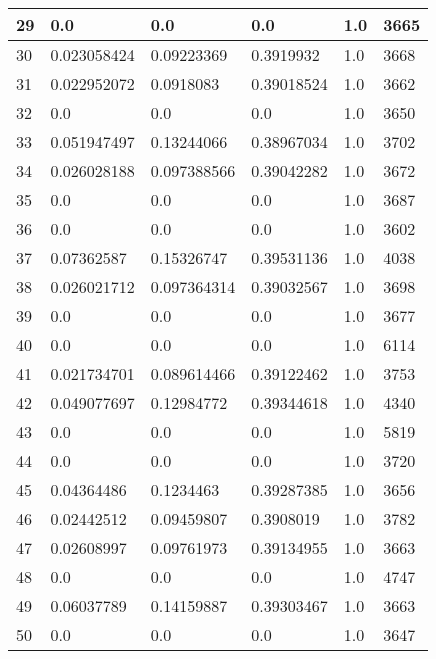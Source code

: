 \begin{longtable}{|l|l|l|l|l|l|}
29 & 0.0 & 0.0 & 0.0 & 1.0 & 3665 \\ \hline 
30 & 0.023058424 & 0.09223369 & 0.3919932 & 1.0 & 3668 \\ \hline 
31 & 0.022952072 & 0.0918083 & 0.39018524 & 1.0 & 3662 \\ \hline 
32 & 0.0 & 0.0 & 0.0 & 1.0 & 3650 \\ \hline 
33 & 0.051947497 & 0.13244066 & 0.38967034 & 1.0 & 3702 \\ \hline 
34 & 0.026028188 & 0.097388566 & 0.39042282 & 1.0 & 3672 \\ \hline 
35 & 0.0 & 0.0 & 0.0 & 1.0 & 3687 \\ \hline 
36 & 0.0 & 0.0 & 0.0 & 1.0 & 3602 \\ \hline 
37 & 0.07362587 & 0.15326747 & 0.39531136 & 1.0 & 4038 \\ \hline 
38 & 0.026021712 & 0.097364314 & 0.39032567 & 1.0 & 3698 \\ \hline 
39 & 0.0 & 0.0 & 0.0 & 1.0 & 3677 \\ \hline 
40 & 0.0 & 0.0 & 0.0 & 1.0 & 6114 \\ \hline 
41 & 0.021734701 & 0.089614466 & 0.39122462 & 1.0 & 3753 \\ \hline 
42 & 0.049077697 & 0.12984772 & 0.39344618 & 1.0 & 4340 \\ \hline 
43 & 0.0 & 0.0 & 0.0 & 1.0 & 5819 \\ \hline 
44 & 0.0 & 0.0 & 0.0 & 1.0 & 3720 \\ \hline 
45 & 0.04364486 & 0.1234463 & 0.39287385 & 1.0 & 3656 \\ \hline 
46 & 0.02442512 & 0.09459807 & 0.3908019 & 1.0 & 3782 \\ \hline 
47 & 0.02608997 & 0.09761973 & 0.39134955 & 1.0 & 3663 \\ \hline 
48 & 0.0 & 0.0 & 0.0 & 1.0 & 4747 \\ \hline 
49 & 0.06037789 & 0.14159887 & 0.39303467 & 1.0 & 3663 \\ \hline 
50 & 0.0 & 0.0 & 0.0 & 1.0 & 3647 \\ \hline 
\end{longtable}